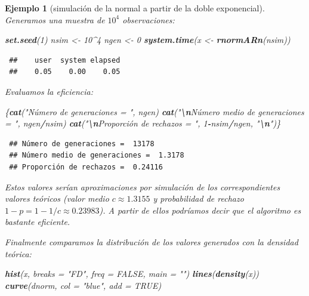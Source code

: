 \documentclass[
  spanish,
  10pt,
]{book}
\newenvironment{Shaded}{\begin{snugshade}}{\end{snugshade}}
\newcommand{\AttributeTok}[1]{\textcolor[rgb]{0.13,0.29,0.53}{#1}}
\newcommand{\ConstantTok}[1]{\textcolor[rgb]{0.56,0.35,0.01}{#1}}
\newcommand{\DecValTok}[1]{\textcolor[rgb]{0.00,0.00,0.81}{#1}}
\newcommand{\FunctionTok}[1]{\textcolor[rgb]{0.13,0.29,0.53}{\textbf{#1}}}
\newcommand{\NormalTok}[1]{#1}
\newcommand{\OtherTok}[1]{\textcolor[rgb]{0.56,0.35,0.01}{#1}}
\newcommand{\SpecialCharTok}[1]{\textcolor[rgb]{0.81,0.36,0.00}{\textbf{#1}}}
\newcommand{\StringTok}[1]{\textcolor[rgb]{0.31,0.60,0.02}{#1}}
\theoremstyle{break}
\newtheorem{example}{Ejemplo}[chapter]
\theoremstyle{nonumberplain}
\begin{document}
\begin{example}[simulación de la normal a partir de la doble exponencial]
Generamos una muestra de \(10^4\) observaciones:

\begin{Shaded}
\begin{Highlighting}[]
\FunctionTok{set.seed}\NormalTok{(}\DecValTok{1}\NormalTok{)}
\NormalTok{nsim }\OtherTok{\textless{}{-}} \DecValTok{10}\SpecialCharTok{\^{}}\DecValTok{4}
\NormalTok{ngen }\OtherTok{\textless{}{-}} \DecValTok{0}
\FunctionTok{system.time}\NormalTok{(x }\OtherTok{\textless{}{-}} \FunctionTok{rnormARn}\NormalTok{(nsim))}
\end{Highlighting}
\end{Shaded}

\begin{verbatim}
 ##    user  system elapsed 
 ##    0.05    0.00    0.05
\end{verbatim}

Evaluamos la eficiencia:

\begin{Shaded}
\begin{Highlighting}[]
\NormalTok{\{}\FunctionTok{cat}\NormalTok{(}\StringTok{"Número de generaciones = "}\NormalTok{, ngen)}
\FunctionTok{cat}\NormalTok{(}\StringTok{"}\SpecialCharTok{\textbackslash{}n}\StringTok{Número medio de generaciones = "}\NormalTok{, ngen}\SpecialCharTok{/}\NormalTok{nsim)}
\FunctionTok{cat}\NormalTok{(}\StringTok{"}\SpecialCharTok{\textbackslash{}n}\StringTok{Proporción de rechazos = "}\NormalTok{, }\DecValTok{1}\SpecialCharTok{{-}}\NormalTok{nsim}\SpecialCharTok{/}\NormalTok{ngen, }\StringTok{"}\SpecialCharTok{\textbackslash{}n}\StringTok{"}\NormalTok{)\}}
\end{Highlighting}
\end{Shaded}

\begin{verbatim}
 ## Número de generaciones =  13178
 ## Número medio de generaciones =  1.3178
 ## Proporción de rechazos =  0.24116
\end{verbatim}

Estos valores serían aproximaciones por simulación de los correspondientes valores teóricos (valor medio \(c \approx 1.3155\) y probabilidad de rechazo \(1 - p = 1 - 1/c \approx 0.23983\)).
A partir de ellos podríamos decir que el algoritmo es bastante eficiente.

Finalmente comparamos la distribución de los valores generados con la densidad teórica:

\begin{Shaded}
\begin{Highlighting}[]
\FunctionTok{hist}\NormalTok{(x, }\AttributeTok{breaks =} \StringTok{"FD"}\NormalTok{, }\AttributeTok{freq =} \ConstantTok{FALSE}\NormalTok{, }\AttributeTok{main =} \StringTok{""}\NormalTok{)}
\FunctionTok{lines}\NormalTok{(}\FunctionTok{density}\NormalTok{(x))}
\FunctionTok{curve}\NormalTok{(dnorm, }\AttributeTok{col =} \StringTok{"blue"}\NormalTok{, }\AttributeTok{add =} \ConstantTok{TRUE}\NormalTok{)}
\end{Highlighting}
\end{Shaded}


\end{example}
\end{document}
